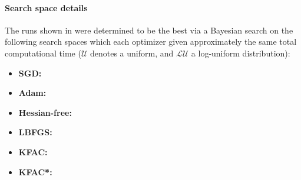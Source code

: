 \paragraph{Search space details} The runs shown in  were determined to be the best via a Bayesian search on the following search spaces which each optimizer given approximately the same total computational time ($\mathcal{U}$ denotes a uniform, and $\mathcal{LU}$ a log-uniform distribution):
\begin{itemize}
  \def\pathToRuns{kfac_pinns_exp/exp31_heat4d_mlp_tanh_256_bayes/tex/}
\item \textbf{SGD:} 
\item \textbf{Adam:} 
\item \textbf{Hessian-free:} 
\item \textbf{LBFGS:} 
\item \textbf{KFAC:} 
\item \textbf{KFAC*:} 
\end{itemize}

